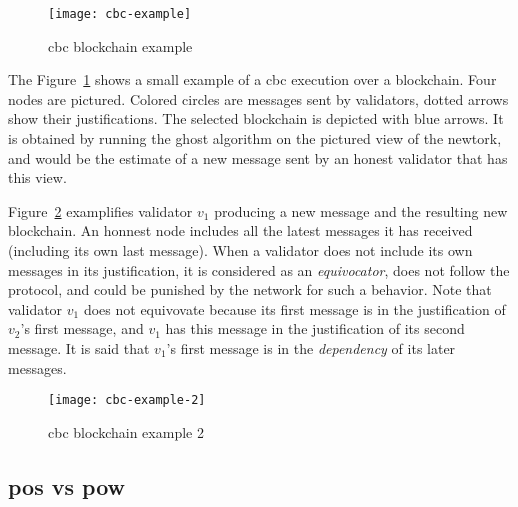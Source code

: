 \begin{figure}[H]
	\centering
	\texttt{[image: cbc-example]}
  \captionsetup{justification=centering}
    \caption{\gls{cbc} blockchain example}
	\label{fig:example}
\end{figure}

The Figure~\ref{fig:example} shows a small example of a \gls{cbc} execution
over a blockchain. Four nodes are pictured. Colored circles are messages sent by
validators, dotted arrows show their justifications. The selected blockchain is
depicted with blue arrows. It is obtained by running the \gls{ghost} algorithm
on the pictured view of the newtork, and would be the estimate of a new message
sent by an honest validator that has this view.

Figure~\ref{fig:example2} examplifies validator \(v_1\) producing a new message
and the resulting new blockchain. An honnest node includes all the latest
messages it has received (including its own last message). When a validator does
not include its own messages in its justification, it is considered as an
\textit{equivocator}, does not follow the protocol, and could be punished by
the network for such a behavior. Note that validator \(v_1\) does not equivovate
because its first message is in the justification of \(v_2\)'s first message,
and \(v_1\) has this message in the justification of its second message. It is
said that \(v_1\)'s first message is in the \textit{dependency} of its later
messages.

\begin{figure}
	\centering
	\texttt{[image: cbc-example-2]}
  \captionsetup{justification=centering}
    \caption{\gls{cbc} blockchain example 2}
	\label{fig:example2}
\end{figure}



\subsection{\gls{pos} vs \gls{pow}}

